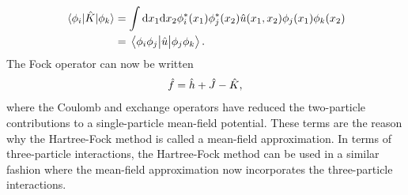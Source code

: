             \begin{align}
                \mel{\phi_i}{\hat{K}}{\phi_k}
                &= \int\dd x_1\dd x_2
                \phi^{*}_i(x_1)\phi^{*}_j(x_2)
                \hat{u}(x_1, x_2)
                \phi_j(x_1)\phi_k(x_2)
                \\
                &=
                \mel{\phi_i\phi_j}{\hat{u}}{\phi_j\phi_k}.
            \end{align}
            The Fock operator can now be written
            \begin{align}
                \hat{f}
                = \hat{h}
                + \hat{J} - \hat{K},
            \end{align}
            where the Coulomb and exchange operators have reduced the
            two-particle contributions to a single-particle mean-field
            potential.
            These terms are the reason why the Hartree-Fock method is called a
            mean-field approximation.
            In terms of three-particle interactions, the Hartree-Fock method can
            be used in a similar fashion where the mean-field approximation now
            incorporates the three-particle interactions.

